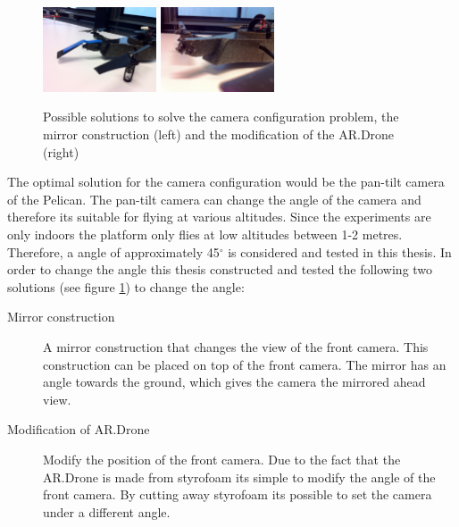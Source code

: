 \documentclass[a4paper]{article}
\begin{document}
\begin{figure}[!ht]
\centering
\includegraphics[width=0.3\textwidth]{images/mirror_construction.jpg}
\includegraphics[width=0.3\textwidth]{images/ardrone_mod.jpg}
\caption{Possible solutions to solve the camera configuration problem, the mirror construction (left) and the modification of the AR.Drone (right)}
\label{camera_configuration}
\end{figure}

The optimal solution for the camera configuration would be the pan-tilt camera of the Pelican. The pan-tilt camera can change the angle of the camera and therefore its suitable for flying at various altitudes. Since the experiments are only indoors the platform only flies at low altitudes between 1-2 metres. Therefore, a angle of approximately 45$^{\circ}$ is considered and tested in this thesis. In order to change the angle this thesis constructed and tested the following two solutions (see figure \ref{camera_configuration}) to change the angle:
\begin{description}
\item[Mirror construction] A mirror construction that changes the view of the front camera. This construction can be placed on top of the front camera. The mirror has an angle towards the ground, which gives the camera the mirrored ahead view.
\item[Modification of AR.Drone] Modify the position of the front camera. Due to the fact that the AR.Drone is made from styrofoam its simple to modify the angle of the front camera. By cutting away styrofoam its possible to set the camera under a different angle.
\end{description}
\end{document}
